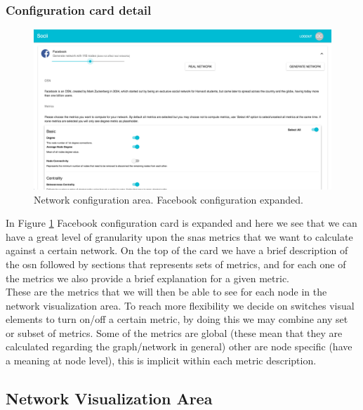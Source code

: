 \subsubsection*{Configuration card detail}

\begin{figure}[h!]
\begin{center}
  \hspace*{-0.8in}
  \includegraphics[width=1.2\textwidth]{img/socii/socii_2.png}
\end{center}
\caption{\label{img:socii_2} Network configuration area. Facebook configuration expanded.}
\end{figure}

In Figure \ref{img:socii_2} Facebook configuration card is expanded and here we see that we can have a great level of granularity upon the \glspl{sna} metrics that we want to calculate against a certain network. On the top of the card we have a brief description of the \gls{osn} followed by sections that represents sets of metrics, and for each one of the metrics we also provide a brief explanation for a given metric.\\
\indent These are the metrics that we will then be able to see for each node in the network visualization area. To reach more flexibility we decide on switches visual elements to turn on/off a certain metric, by doing this we may combine any set or subset of metrics. Some of the metrics are global (these mean that they are calculated regarding the graph/network in general) other are node specific (have a meaning at node level), this is implicit within each metric description.

\subsection{Network Visualization Area}

